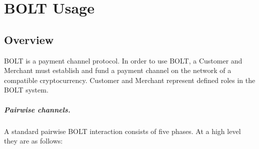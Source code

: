 \documentclass[10pt]{report}
\begin{document}
\chapter{BOLT Usage}
\label{ch:usage}

\section{Overview}

BOLT is a payment channel protocol. In order to use BOLT, a Customer and Merchant must establish and fund a payment channel on the network of a compatible cryptocurrency. Customer and Merchant represent defined roles in the BOLT system.

\paragraph{Pairwise channels.} A standard pairwise BOLT interaction consists of five phases. At a high level they are as follows:
\end{document}
